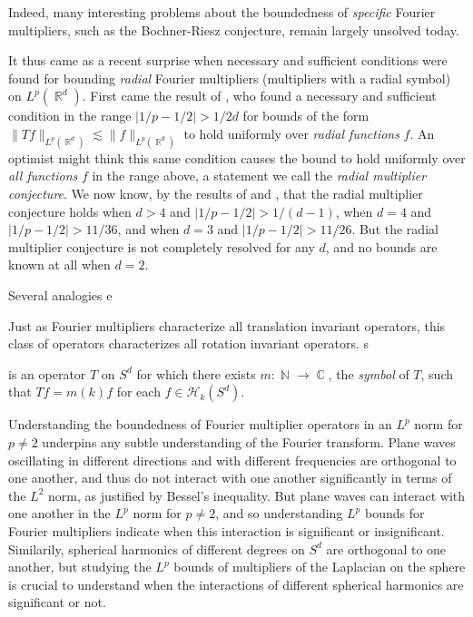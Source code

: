 \documentclass[12pt]{article}
\DeclareMathOperator{\ZZ}{\mathbb{Z}}
\DeclareMathOperator{\RR}{\mathbb{R}}
\DeclareMathOperator{\NN}{\mathbb{N}}
\DeclareMathOperator{\CC}{\mathbb{C}}
\begin{document}
 Indeed, many interesting problems about the boundedness of \emph{specific} Fourier multipliers, such as the Bochner-Riesz conjecture, remain largely unsolved today.

It thus came as a recent surprise when necessary and sufficient conditions were found for bounding \emph{radial} Fourier multipliers (multipliers with a radial symbol) on $L^p(\RR^d)$. First came the result of \cite{GarrigosSeeger}, who found a necessary and sufficient condition in the range $|1/p - 1/2| > 1/2d$ for bounds of the form $\| Tf \|_{L^p(\RR^d)} \lesssim \| f \|_{L^p(\RR^d)}$ to hold uniformly over \emph{radial functions} $f$.
An optimist might think this same condition causes the bound to hold uniformly over \emph{all functions} $f$ in the range above, a statement we call the \emph{radial multiplier conjecture}. We now know, by the results of \cite{HeoNazarovSeeger} and \cite{Cladek}, that the radial multiplier conjecture holds when $d > 4$ and $|1/p - 1/2| > 1/(d-1)$, when $d = 4$ and $|1/p - 1/2| > 11/36$, and when $d = 3$ and $|1/p - 1/2| > 11/26$. But the radial multiplier conjecture is not completely resolved for any $d$, and no bounds are known at all when $d = 2$.

Several analogies e


Just as Fourier multipliers characterize all translation invariant operators, this class of operators characterizes all rotation invariant operators. 
s



 is an operator $T$ on $S^d$ for which there exists $m: \NN \to \CC$, the \emph{symbol} of $T$, such that $Tf = m(k) f$ for each $f \in \mathcal{H}_k(S^d)$.

Understanding the boundedness of Fourier multiplier operators in an $L^p$ norm for $p \neq 2$ underpins any subtle understanding of the Fourier transform. Plane waves oscillating in different directions and with different frequencies are orthogonal to one another, and thus do not interact with one another significantly in terms of the $L^2$ norm, as justified by Bessel's inequality. But plane waves can interact with one another in the $L^p$ norm for $p \neq 2$, and so understanding $L^p$ bounds for Fourier multipliers indicate when this interaction is significant or insignificant. Similarily, spherical harmonics of different degrees on $S^d$ are orthogonal to one another, but studying the $L^p$ bounds of multipliers of the Laplacian on the sphere is crucial to understand when the interactions of different spherical harmonics are significant or not.
\end{document}
